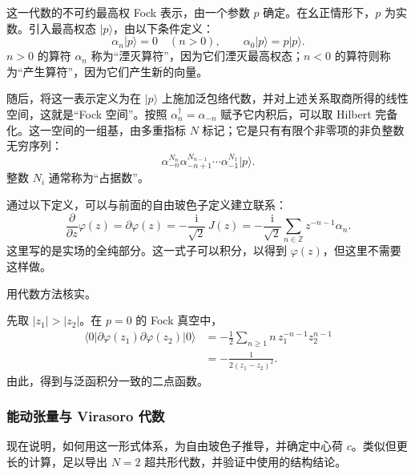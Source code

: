 这一代数的不可约最高权 Fock 表示，由一个参数 $p$ 确定。在幺正情形下，$p$ 为实数。引入最高权态 $|p\rangle$，由以下条件定义：
\[
\alpha_n|p\rangle=0\quad(n>0),\qquad
\alpha_0|p\rangle=p|p\rangle.
\]
$n>0$ 的算符 $\alpha_n$ 称为“湮灭算符”，因为它们湮灭最高权态；$n<0$ 的算符则称为“产生算符”，因为它们产生新的向量。

随后，将这一表示定义为在 $|p\rangle$ 上施加泛包络代数，并对上述关系取商所得的线性空间，这就是“Fock 空间”。按照 $\alpha_n^\dagger=\alpha_{-n}$ 赋予它内积后，可以取 Hilbert 完备化。这一空间的一组基，由多重指标 $N$ 标记；它是只有有限个非零项的非负整数无穷序列：
\begin{equation}\label{eq:3.47}
\alpha_{-n}^{N_n}\alpha_{-n+1}^{N_{n-1}}
\cdots\alpha_{-1}^{N_1}|p\rangle.
\end{equation}
整数 $N_i$ 通常称为“占据数”。

通过以下定义，可以与前面的自由玻色子定义建立联系：
\begin{equation}\label{eq:3.48}
\frac{\partial}{\partial z}\varphi(z)
=\partial\varphi(z)
=-\frac{\mathrm{i}}{\sqrt2}\,J(z)
=-\frac{\mathrm{i}}{\sqrt2}
\sum_{n\in\mathbb{Z}}z^{-n-1}\alpha_n.
\end{equation}
这里写的是实场的全纯部分。这一式子可以积分，以得到 $\varphi(z)$，但这里不需要这样做。

\begin{example*}
用代数方法核实。
\begin{solution}
先取 $|z_1|>|z_2|$。在 $p=0$ 的 Fock 真空中，
\[
\begin{aligned}
\langle0|\partial\varphi(z_1)\partial\varphi(z_2)|0\rangle
&=-\frac12\sum_{n\ge1}n\,z_1^{-n-1}z_2^{n-1}\\
&=-\frac1{2(z_1-z_2)^2}.
\end{aligned}
\]
由此，得到与泛函积分一致的二点函数。
\end{solution}
\end{example*}

\subsubsection{能动张量与 Virasoro 代数}\label{sec:3.2.3.3}

现在说明，如何用这一形式体系，为自由玻色子推导，并确定中心荷 $c$。类似但更长的计算，足以导出 $N=2$ 超共形代数，并验证中使用的结构结论。

